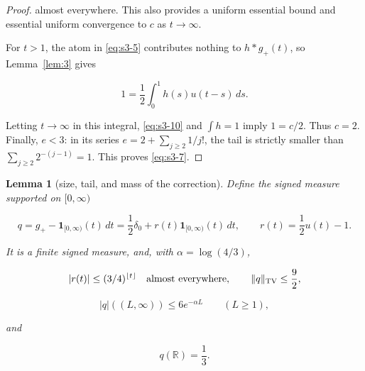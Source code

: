 \documentclass[10pt]{article}
\numberwithin{equation}{section}
\newtheorem{lemma}[theorem]{Lemma}
\theoremstyle{remark}
\begin{document}
\begin{proof}
almost everywhere. This also provides a uniform essential bound and
essential uniform convergence to \(c\) as \(t\to\infty\).

For \(t>1\), the atom in \eqref{eq:s3-5} contributes nothing to \(h*g_+(t)\), so
Lemma~\ref{lem:3} gives

\[
1=\frac12\int_0^1 h(s)u(t-s)\,ds.
\]

Letting \(t\to\infty\) in this integral, \eqref{eq:s3-10} and \(\int h=1\) imply
\(1=c/2\). Thus \(c=2\). Finally, \(e<3\): in its series
\(e=2+\sum_{j\ge2}1/j!\), the tail is strictly smaller than
\(\sum_{j\ge2}2^{-(j-1)}=1\). This proves \eqref{eq:s3-7}. \end{proof}

\begin{lemma}[size, tail, and mass of the correction]\label{lem:5} Define the signed
measure supported on \([0,\infty)\)

\begin{equation}
q=g_+-\mathbf1_{[0,\infty)}(t)\,dt
=\frac12\delta_0+r(t)\mathbf1_{[0,\infty)}(t)\,dt,
\qquad r(t)=\frac12u(t)-1.
\label{eq:s3-11}
\end{equation}

It is a finite signed measure, and, with \(\alpha=\log(4/3)\),

\begin{equation}
|r(t)|\le(3/4)^{\lfloor t\rfloor}\quad\hbox{almost everywhere},
\qquad \|q\|_{\rm TV}\le\frac92,
\label{eq:s3-12}
\end{equation}

\begin{equation}
|q|((L,\infty))\le6e^{-\alpha L}\qquad(L\ge1),
\label{eq:s3-13}
\end{equation}

and

\begin{equation}
q(\mathbb R)=\frac13.
\label{eq:s3-14}
\end{equation}

\end{lemma}
\end{document}
